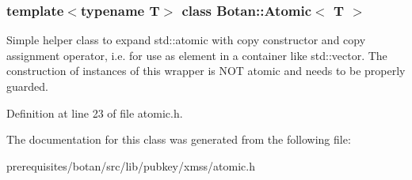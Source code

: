 \subsubsection*{template$<$typename T$>$\newline
class Botan\+::\+Atomic$<$ T $>$}

Simple helper class to expand std\+::atomic with copy constructor and copy assignment operator, i.\+e. for use as element in a container like std\+::vector. The construction of instances of this wrapper is N\+OT atomic and needs to be properly guarded. 

Definition at line 23 of file atomic.\+h.



The documentation for this class was generated from the following file\+:\begin{DoxyCompactItemize}
\item 
prerequisites/botan/src/lib/pubkey/xmss/atomic.\+h\end{DoxyCompactItemize}
